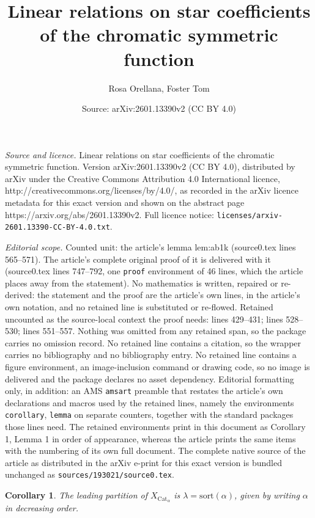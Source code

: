 \documentclass[10pt,a4paper]{amsart}
\title{Linear relations on star coefficients of the chromatic symmetric function}
\author{Rosa Orellana, Foster Tom}
\date{Source: arXiv:2601.13390v2 (CC BY 4.0)}
\newtheorem{corollary}{Corollary}
\begin{document}
\maketitle

\noindent\emph{Source and licence.} Linear relations on star coefficients of the chromatic symmetric function. Version arXiv:2601.13390v2 (CC BY 4.0), distributed by arXiv under the Creative Commons Attribution 4.0 International licence, http://creativecommons.org/licenses/by/4.0/, as recorded in the arXiv licence metadata for this exact version and shown on the abstract page https://arxiv.org/abs/2601.13390v2. Full licence notice: \texttt{licenses/arxiv-2601.13390-CC-BY-4.0.txt}.\par\smallskip

\noindent\textit{Editorial scope.} Counted unit: the article's lemma lem:ab1k (source0.tex lines 565--571). The article's complete original proof of it is delivered with it (source0.tex lines 747--792, one \texttt{proof} environment of 46 lines, which the article places away from the statement). No mathematics is written, repaired or re-derived: the statement and the proof are the article's own lines, in the article's own notation, and no retained line is substituted or re-flowed.  Retained uncounted as the source-local context the proof needs: lines 429--431; lines 528--530; lines 551--557.  Nothing was omitted from any retained span, so the package carries no omission record.  No retained line contains a citation, so the wrapper carries no bibliography and no bibliography entry.  No retained line contains a figure environment, an image-inclusion command or drawing code, so no image is delivered and the package declares no asset dependency.  Editorial formatting only, in addition: an AMS \texttt{amsart} preamble that restates the article's own declarations and macros used by the retained lines, namely the environments \texttt{corollary}, \texttt{lemma} on separate counters, together with the standard packages those lines need.  The retained environments print in this document as Corollary 1, Lemma 1 in order of appearance, whereas the article prints the same items with the numbering of its own full document.  The complete native source of the article as distributed in the arXiv e-print for this exact version is bundled unchanged as \texttt{sources/193021/source0.tex}.
\begin{corollary}\label{cor:catleading}
The leading partition of $X_{\text{Cat}_\alpha}$ is $\lambda=\text{sort}(\alpha)$, given by writing $\alpha$ in decreasing order.
\end{corollary}
\end{document}
